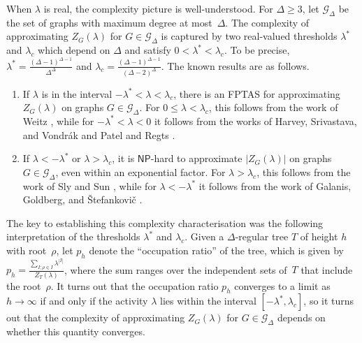 \documentclass[11pt]{article}
\def\NP{\mathsf{NP}}
\begin{document}
When $\lambda$ is real, the complexity picture is well-understood.
For $\Delta\geq 3$, let $\mathcal{G}_\Delta$ be the set of graphs
with maximum degree at most~$\Delta$.
The complexity of
approximating $Z_G(\lambda)$ for $G\in \mathcal{G}_\Delta$ is captured
by two real-valued thresholds
$\lambda^*$ and $\lambda_c$ which depend on $\Delta$ and satisfy $0<\lambda^* < \lambda_c$.
To be precise,    $\lambda^*=\frac{(\Delta-1)^{\Delta-1}}{\Delta^{\Delta}}$ and $\lambda_c=\frac{(\Delta-1)^{\Delta-1}}{(\Delta-2)^{\Delta}}$.
The known  results are as follows.  
\begin{enumerate}
\item If $\lambda$ is in the interval  $-\lambda^*<\lambda<\lambda_c$, there  is an FPTAS for approximating $Z_G(\lambda)$ on graphs 
$G\in \mathcal{G}_\Delta$. For $0\leq\lambda<\lambda_c$, this follows from the work of Weitz \cite{Weitz}, while for $-\lambda^*<\lambda<0$
it follows  from the works of Harvey, Srivastava, and Vondr\'{a}k \cite{Piyush} and Patel and Regts \cite{PR}.
\item  If  $\lambda<-\lambda^*$ or $\lambda>\lambda_c$, it is $\NP$-hard to approximate $|Z_G(\lambda)|$ on graphs $G\in \mathcal{G}_\Delta$, even within an exponential factor. For  $\lambda>\lambda_c$, this follows from the work of Sly and Sun \cite{SlySun}, while for $\lambda<-\lambda^*$ it follows  from the work of Galanis, Goldberg, and \v{S}tefankovi\v{c} \cite{GGS}.
\end{enumerate}
The  key to establishing   this complexity characterisation was the following interpretation of the thresholds $\lambda^*$ and $\lambda_c$. 
Given a $\Delta$-regular tree $T$ of height $h$ with root~$\rho$, let $p_h$ denote the ``occupation ratio'' of the tree, 
which is given by $p_h=\frac{\sum_{I; \rho\in I}\lambda^{|I|}}{Z_{T}(\lambda)}$,
where   the sum ranges over  the independent sets of~$T$ that include the root~$\rho$. It turns out that the occupation ratio $p_h$ converges to a limit as $h\rightarrow\infty$ if and only if the activity $\lambda$ lies within the interval $[-\lambda^*,\lambda_c]$, so it turns out that the complexity of approximating
$Z_G(\lambda)$ for $G\in \mathcal{G}_\Delta$ depends on whether this  quantity converges.
\end{document}
